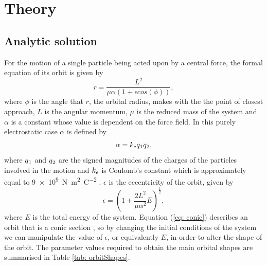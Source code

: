 \documentclass[12pt]{article} %
\numberwithin{equation}{subsection} %
\begin{document}
\section{Theory}

\subsection{Analytic solution} \label{sec: analytic}
\FloatBarrier

For the motion of a single particle being acted upon by a central force, the formal equation of its orbit is given by \cite[p; 28]{fetter2003theoretical}
\begin{equation}
    r=\frac{L^{2}}{\mu \alpha (1+\epsilon cos(\phi))}, \label{eq: conic}
\end{equation}
where $\phi$ is the angle that $r$, the orbital radius, makes with the the point of closest approach, $L$ is the angular momentum, $\mu$ is the reduced mass of the system and $\alpha$ is a constant whose value is dependent on the force field. In this purely electrostatic case $\alpha$ is defined by \cite[p; 7]{huray2011maxwell}
\begin{equation}
    \alpha=k\textsubscript{e}q\textsubscript{1}q\textsubscript{2}, \label{eq: coulomb}
\end{equation}
where $q\textsubscript{1}$ and $q\textsubscript{2}$ are the signed magnitudes of the charges of the particles involved in the motion and $k\textsubscript{e}$ is Coulomb's constant which is approximately equal to \SI{9e9}{N m^{2} C^{-2}} \cite[p; 7]{huray2011maxwell}. $\epsilon$ is the eccentricity of the orbit, given by \cite[p; 28]{fetter2003theoretical}
\begin{equation}
    \epsilon=\left(1+\frac{2L^{2}}{\mu \alpha^{2}}E\right)^{\frac{1}{2}}, \label{eq: eccen} 
\end{equation}
where $E$ is the total energy of the system. Equation (\ref{eq: conic}) describes an orbit that is a conic section \cite[p; 28]{fetter2003theoretical}, so by changing the initial conditions of the system we can manipulate the value of $\epsilon$, or equivalently $E$, in order to alter the shape of the orbit. The parameter values required to obtain the main orbital shapes are summarised in Table \ref{tab: orbitShapes}.
\end{document}
